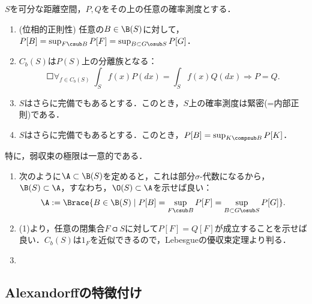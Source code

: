 \documentclass[uplatex,dvipdfmx]{jsreport}
\begin{document}
\begin{lemma}[弱収束理論の基本補題]
    $S$を可分な距離空間，$P,Q$をその上の任意の確率測度とする．
    \begin{enumerate}
        \item (位相的正則性) 任意の$B\in\B(S)$に対して，$P[B]=\sup_{F\csub B}P[F]=\sup_{B\subset G\osub S}P[G]$．
        \item $C_b(S)$は$P(S)$上の分離族となる：
        \[\Square{\forall_{f\in C_b(S)}\;\int_Sf(x)P(dx)=\int_Sf(x)Q(dx)}\Rightarrow P=Q.\]
        \item $S$はさらに完備でもあるとする．このとき，$S$上の確率測度は緊密(=内部正則)である．
        \item $S$はさらに完備でもあるとする．このとき，$P[B]=\sup_{K\compsub B}P[K]$．
    \end{enumerate}
    特に，弱収束の極限は一意的である．
\end{lemma}
\begin{Proof}\mbox{}
    \begin{enumerate}
        \item 次のように$\A\subset\B(S)$を定めると，これは部分$\sigma$-代数になるから，$\B(S)\subset\A$，すなわち，$\O(S)\subset\A$を示せば良い：
        \[\A:=\Brace{B\in\B(S)\mid P[B]=\sup_{F\csub B}P[F]=\sup_{B\subset G\osub S}P[G]}.\]
        \item (1)より，任意の閉集合$F\csub S$に対して$P[F]=Q[F]$が成立することを示せば良い．$C_b(S)$は$1_F$を近似できるので，Lebesgueの優収束定理より判る．
        \item 
    \end{enumerate}
\end{Proof}

\subsection{Alexandorffの特徴付け}
\end{document}
